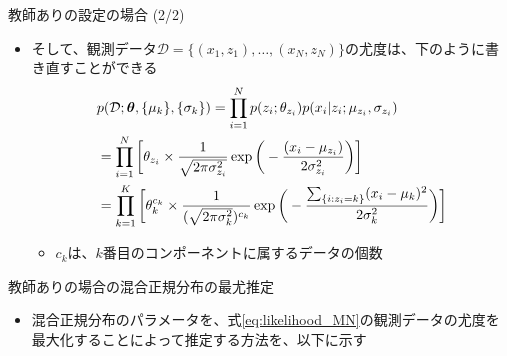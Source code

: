 \documentclass[aspectratio=169,unicode,dvipdfmx,14pt]{beamer}
\begin{document}
\begin{frame}{教師ありの設定の場合 (2/2)}
\begin{itemize}
\item そして、観測データ$\mathcal{D} = \{ (x_1,z_1), \ldots, (x_N,z_N) \}$の尤度は、下のように書き直すことができる
\vspace{-.1in}
\begin{align}
& p(\mathcal{D};\bm{\theta}, \{ \mu_k \}, \{ \sigma_k \} )
= \prod_{i=1}^N p(z_i ; \theta_{z_i}) p(x_i | z_i ; \mu_{z_i}, \sigma_{z_i})
\notag \\ &
= \prod_{i=1}^N \bigg[ \theta_{z_i} \times \frac{1}{\sqrt{2\pi\sigma_{z_i}^2}}\exp\bigg( - \frac{(x_i - \mu_{z_i})}{2\sigma_{z_i}^2} \bigg) \bigg]
\notag \\ &
= \prod_{k=1}^K \bigg[ \theta_k^{c_k} \times \frac{1}{ (\sqrt{2\pi\sigma_k^2} )^{c_k}} 
\exp\bigg( - \frac{ \sum_{ \{ i : z_i = k \} } (x_i - \mu_k)^2 }{2\sigma_k^2} \bigg) \bigg]
\label{eq:likelihood_MN}
\end{align}
\vspace{-.15in}
\begin{itemize}
\item $c_k$は、$k$番目のコンポーネントに属するデータの個数
\end{itemize}
\end{itemize}
\end{frame}


\begin{frame}{教師ありの場合の混合正規分布の最尤推定}
\begin{itemize}
\item 混合正規分布のパラメータを、式\eqref{eq:likelihood_MN}の観測データの尤度を最大化することによって推定する方法を、以下に示す
\end{itemize}
\end{frame}
\end{document}
